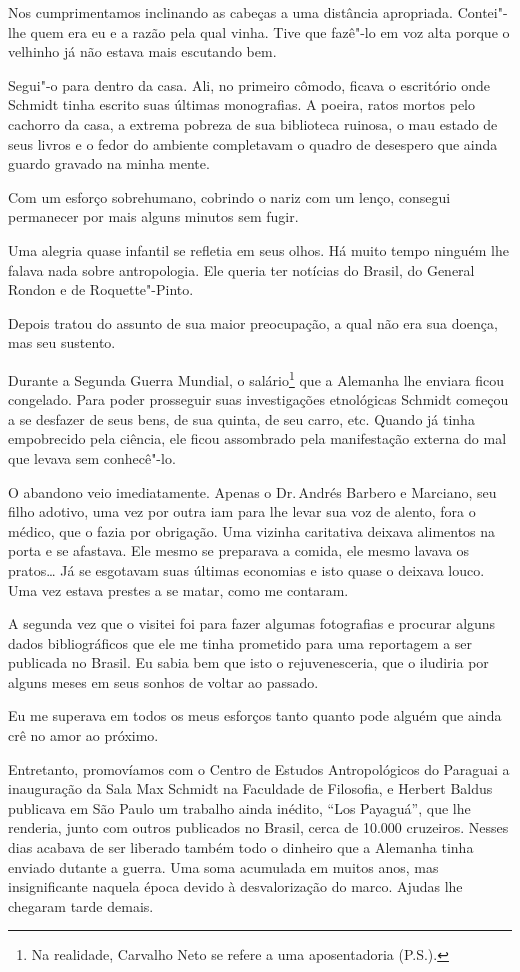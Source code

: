 Nos cumprimentamos inclinando as cabeças a uma distância apropriada.
Contei"-lhe quem era eu e a razão pela qual vinha. Tive que fazê"-lo em
voz alta porque o velhinho já não estava mais escutando bem.

Segui"-o para dentro da casa. Ali, no primeiro cômodo, ficava o
escritório onde Schmidt tinha escrito suas últimas monografias. A
poeira, ratos mortos pelo cachorro da casa, a extrema pobreza de sua
biblioteca ruinosa, o mau estado de seus livros e o fedor do ambiente
completavam o quadro de desespero que ainda guardo gravado na minha
mente.

Com um esforço sobrehumano, cobrindo o nariz com um lenço, consegui
permanecer por mais alguns minutos sem fugir.

Uma alegria quase infantil se refletia em seus olhos. Há muito tempo
ninguém lhe falava nada sobre antropologia. Ele queria ter notícias do
Brasil, do General Rondon e de Roquette"-Pinto.

Depois tratou do assunto de sua maior preocupação, a qual não era sua
doença, mas seu sustento.

Durante a Segunda Guerra Mundial, o salário\footnote{Na realidade,
  Carvalho Neto se refere a uma aposentadoria (P.S.).} que a Alemanha
lhe enviara ficou congelado. Para poder prosseguir suas investigações
etnológicas Schmidt começou a se desfazer de seus bens, de sua quinta,
de seu carro, etc. Quando já tinha empobrecido pela ciência, ele ficou
assombrado pela manifestação externa do mal que levava sem conhecê"-lo.

O abandono veio imediatamente. Apenas o Dr.\,Andrés Barbero e Marciano,
seu filho adotivo, uma vez por outra iam para lhe levar sua voz de
alento, fora o médico, que o fazia por obrigação. Uma vizinha caritativa
deixava alimentos na porta e se afastava. Ele mesmo se preparava a
comida, ele mesmo lavava os pratos\ldots{} Já se esgotavam suas últimas
economias e isto quase o deixava louco. Uma vez estava prestes a se
matar, como me contaram.

A segunda vez que o visitei foi para fazer algumas fotografias e
procurar alguns dados bibliográficos que ele me tinha prometido para uma
reportagem a ser publicada no Brasil. Eu sabia bem que isto o
rejuvenesceria, que o iludiria por alguns meses em seus sonhos de voltar
ao passado.

Eu me superava em todos os meus esforços tanto quanto pode alguém que
ainda crê no amor ao próximo.

Entretanto, promovíamos com o Centro de Estudos Antropológicos do
Paraguai a inauguração da Sala Max Schmidt na Faculdade de Filosofia, e
Herbert Baldus publicava em São Paulo um trabalho ainda inédito, ``Los
Payaguá'', que lhe renderia, junto com outros publicados no Brasil,
cerca de 10.000 cruzeiros. Nesses dias acabava de ser liberado também
todo o dinheiro que a Alemanha tinha enviado dutante a guerra. Uma soma
acumulada em muitos anos, mas insignificante naquela época devido à
desvalorização do marco. Ajudas lhe chegaram tarde demais.

